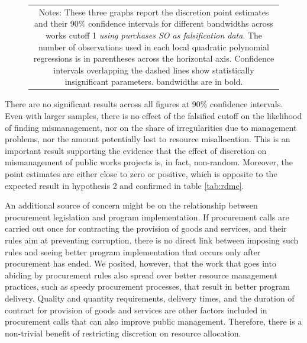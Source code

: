 \documentclass[11pt]{article}
\begin{document}
\begin{figure}[!htbp]
\begin{tabular}{c}
  \multicolumn{1}{p{.67\textwidth}}{\scriptsize Notes: These three graphs report the discretion point estimates and their 90\% confidence intervals for different bandwidths across works cutoff 1 \emph{using purchases SO as falsification data}. The number of observations used in each local quadratic polynomial regressions is in parentheses across the horizontal axis. Confidence intervals overlapping the dashed lines show statistically insignificant parameters. \citet{CalonicoOptimalDataDrivenRegression2015} bandwidths are in bold.}
  \end{tabular}
\end{figure}

There are no significant results across all figures at 90\% confidence intervals. Even with larger samples, there is no effect of the falsified cutoff on the likelihood of finding mismanagement, nor on the share of irregularities due to management problems, nor the amount potentially lost to resource misallocation. This is an important result supporting the evidence that the effect of discretion on mismanagement of public works projects is, in fact, non-random. Moreover, the point estimates are either close to zero or positive, which is opposite to the expected result in hypothesis 2 and confirmed in table \ref{tab:rdmc}.

An additional source of concern might be on the relationship between procurement legislation and program implementation. If procurement calls are carried out once for contracting the provision of goods and services, and their rules aim at preventing corruption, there is no direct link between imposing such rules and seeing better program implementation that occurs only after procurement has ended. We posited, however, that the work that goes into abiding by procurement rules also spread over better resource management practices, such as speedy procurement processes, that result in better program delivery. Quality and quantity requirements, delivery times, and the duration of contract for provision of goods and services are other factors included in procurement calls that can also improve public management. Therefore, there is a non-trivial benefit of restricting discretion on resource allocation.
\end{document}
